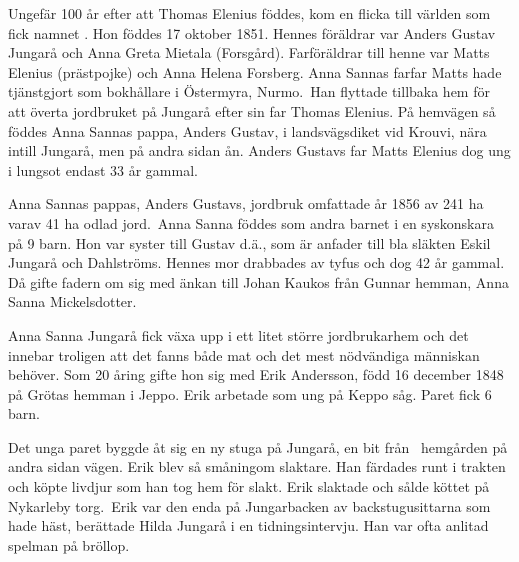%

Ungefär 100 år efter att Thomas Elenius föddes, kom en flicka till världen som fick namnet . Hon föddes 17 oktober 1851. Hennes föräldrar var Anders Gustav Jungarå och Anna Greta Mietala (Forsgård). Farföräldrar till henne var Matts Elenius (prästpojke) och Anna Helena Forsberg. Anna Sannas farfar Matts hade tjänstgjort som bokhållare i Östermyra, Nurmo. Han flyttade tillbaka hem för att överta jordbruket på Jungarå efter sin far Thomas Elenius. På hemvägen så föddes Anna Sannas pappa, Anders Gustav, i landsvägsdiket vid Krouvi, nära intill Jungarå, men på andra sidan ån. Anders Gustavs far Matts Elenius dog ung i lungsot endast 33 år gammal.

Anna Sannas pappas, Anders Gustavs, jordbruk omfattade år 1856 av 241 ha varav 41 ha odlad jord. Anna Sanna föddes som andra barnet i en syskonskara på 9 barn. Hon var syster till Gustav d.ä., som är anfader till bla släkten Eskil Jungarå och Dahlströms. Hennes mor drabbades av tyfus och dog 42 år gammal. Då gifte fadern om sig med änkan till Johan Kaukos från Gunnar hemman, Anna Sanna Mickelsdotter.

Anna Sanna Jungarå fick växa upp i ett litet större jordbrukarhem och det innebar troligen att det fanns både mat och det mest nödvändiga människan behöver. Som 20 åring gifte hon sig med Erik Andersson, född 16 december 1848 på Grötas hemman i Jeppo. Erik arbetade som ung på Keppo såg. Paret fick 6 barn.
\begin{jhchildren}
  \item {}
  \item {}
  \item {}
  \item {}
  \item {}
  \item {}
\end{jhchildren}
Det unga paret byggde åt sig en ny stuga på Jungarå, en bit från  hemgården på andra sidan vägen. Erik blev så småningom slaktare. Han färdades runt i trakten och köpte livdjur som han tog hem för slakt. Erik slaktade och sålde köttet på Nykarleby torg. Erik var den enda på Jungarbacken av backstugusittarna som hade häst, berättade Hilda Jungarå i en tidningsintervju. Han var ofta anlitad spelman på bröllop.

